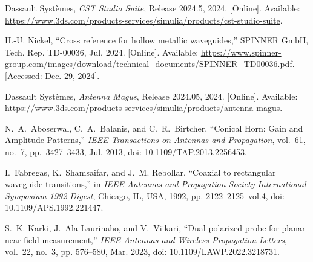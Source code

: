 \documentclass[journal]{IEEEtran}
\begin{document}
\begin{thebibliography}{24}
    Dassault Syst{\`e}mes, \emph{CST Studio Suite}, Release 2024.5, 2024. [Online]. Available: \url{https://www.3ds.com/products-services/simulia/products/cst-studio-suite}.

    H.-U. Nickel, ``Cross reference for hollow metallic waveguides,'' SPINNER GmbH, Tech. Rep. TD-00036, Jul. 2024. [Online]. Available: \url{https://www.spinner-group.com/images/download/technical_documents/SPINNER_TD00036.pdf}. [Accessed: Dec. 29, 2024].

    Dassault Syst{\`e}mes, \emph{Antenna Magus}, Release 2024.05, 2024. [Online]. Available: \url{https://www.3ds.com/products-services/simulia/products/antenna-magus}.

    N.~A.~Aboserwal, C.~A.~Balanis, and C.~R.~Birtcher, ``Conical Horn: Gain and Amplitude Patterns,'' \emph{IEEE Transactions on Antennas and Propagation}, vol.~61, no.~7, pp.~3427--3433, Jul. 2013, doi: 10.1109/TAP.2013.2256453.

    I.~Fabregas, K.~Shamsaifar, and J.~M. Rebollar, ``Coaxial to rectangular waveguide transitions,'' in \emph{IEEE Antennas and Propagation Society International Symposium 1992 Digest}, Chicago, IL, USA, 1992, pp. 2122--2125~vol.4, doi: 10.1109/APS.1992.221447.

    S.~K. Karki, J.~Ala-Laurinaho, and V.~Viikari, ``Dual-polarized probe for planar near-field measurement,'' \emph{IEEE Antennas and Wireless Propagation Letters}, vol.~22, no.~3, pp. 576--580, Mar. 2023, doi: 10.1109/LAWP.2022.3218731.
    
\end{thebibliography}
\end{document}
